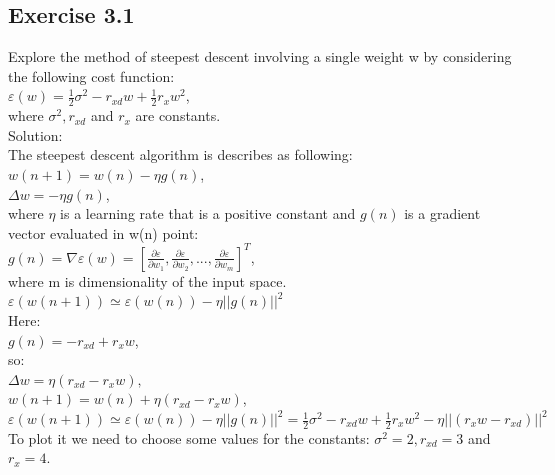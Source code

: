 \documentclass[a4paper, 12pt]{article}
\begin{document}
\subsection*{Exercise 3.1}
Explore the method of steepest descent involving a single weight w by considering the following cost function:\\

$\varepsilon(w) = \frac{1}{2} \sigma^2 - r_{xd}w + \frac{1}{2}r_x w^2$,\\

where $\sigma^2, r_{xd}$ and $r_x$ are constants.\\

Solution:\\

The steepest descent algorithm is describes as following:\\

$w(n+1) = w(n) - \eta g(n)$,\\
$\Delta w = -\eta g(n)$,\\

where $\eta$ is a learning rate that is a positive constant and $g(n)$ is a gradient vector evaluated in w(n) point:\\

$g(n) = \nabla \varepsilon(w) = [\frac{\partial \varepsilon}{\partial w_1}, \frac{\partial \varepsilon}{\partial w_2}, ... , \frac{\partial \varepsilon}{\partial w_m}]^T$, \\

where m is dimensionality of the input space.\\

$\varepsilon(w(n + 1)) \simeq \varepsilon(w(n)) - \eta ||g(n)||^2$\\

Here:\\

$g(n) = -r_{xd} + r_x w $, \\

so: \\

$\Delta w = \eta (r_{xd} - r_x w ),$\\

$w(n+1) = w(n) + \eta (r_{xd} - r_x w )$,\\

$\varepsilon(w(n + 1)) \simeq \varepsilon(w(n)) - \eta ||g(n)||^2 = \frac{1}{2} \sigma^2 - r_{xd}w + \frac{1}{2}r_x w^2 - \eta ||(r_x w - r_{xd})||^2$\\

To plot it we need to choose some values for the constants:  $\sigma^2 = 2, r_{xd} = 3$ and $r_x = 4$.\\
\end{document}
